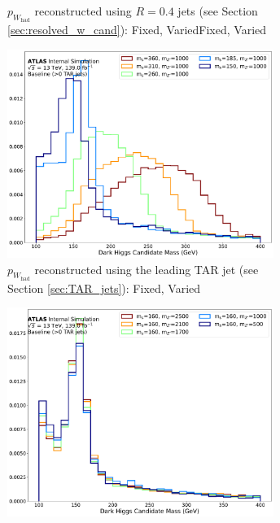 \begin{figure}[H]
\begin{subfigure}[b]{0.49\textwidth}
	\caption{\(p_{W_\text{had}}\) reconstructed using \(R=0.4\) \smallR jets (see Section \ref{sec:resolved_w_cand}): \mZp Fixed, \ms Varied\ms Fixed, \mZp Varied}
	\label{fig:minms_res_mZp}
	\end{subfigure}
	\begin{subfigure}[b]{0.49\textwidth}
	\includegraphics[width=0.95\textwidth]{Figures/5/TARJets10_minmS_mgd_ms.pdf}
	\caption{\(p_{W_\text{had}}\) reconstructed using the leading TAR jet (see Section \ref{sec:TAR_jets}): \mZp Fixed, \ms Varied}
	\label{fig:minms_res_ms}
	\end{subfigure}
	\begin{subfigure}[b]{0.49\textwidth}
	\includegraphics[width=0.95\textwidth]{Figures/5/TARJets10_minmS_mgd_mZp.pdf}

\end{subfigure}
\end{figure}
